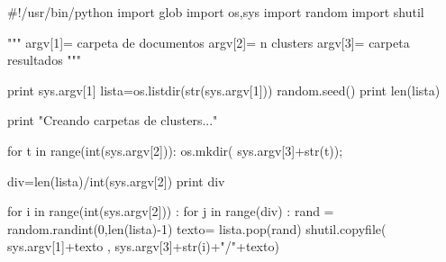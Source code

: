\begin{python}
#!/usr/bin/python
import glob
import os,sys
import random
import shutil

""" argv[1]= carpeta de documentos
	argv[2]= n clusters
	argv[3]= carpeta resultados
"""

print sys.argv[1]
lista=os.listdir(str(sys.argv[1]))
random.seed()
print len(lista)


print "Creando carpetas de clusters..."
	
for t in range(int(sys.argv[2])):
	os.mkdir( sys.argv[3]+str(t));

div=len(lista)/int(sys.argv[2])
print div



for i in range(int(sys.argv[2])) :
	for j in range(div) :	
		rand = random.randint(0,len(lista)-1)	
		texto= lista.pop(rand)	
		shutil.copyfile( sys.argv[1]+texto , sys.argv[3]+str(i)+"/"+texto)
		
		



\end{python}






